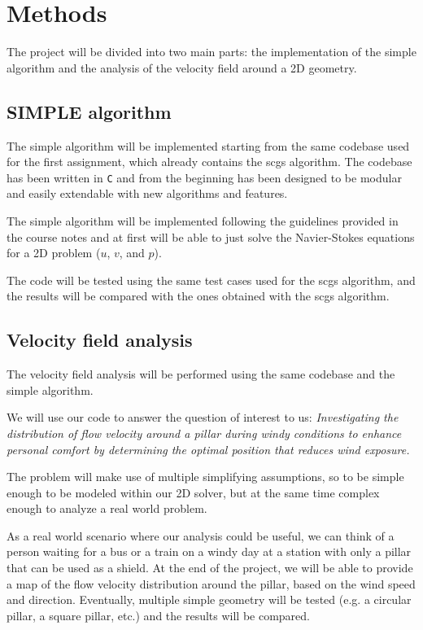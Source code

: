 \section{Methods}

The project will be divided into two main parts: the implementation of the \acrshort{simple} algorithm and the analysis of the velocity field around a 2D geometry.

\subsection{SIMPLE algorithm}

The \acrshort{simple} algorithm will be implemented starting from the same codebase used for the first assignment, which already contains the \acrshort{scgs} algorithm.
The codebase has been written in \texttt{C} and from the beginning has been designed to be modular and easily extendable with new algorithms and features.

The \acrshort{simple} algorithm will be implemented following the guidelines provided in the course notes and at first will be able to just solve the Navier-Stokes equations for a 2D problem ($u$, $v$, and $p$).

The code will be tested using the same test cases used for the \acrshort{scgs} algorithm, and the results will be compared with the ones obtained with the \acrshort{scgs} algorithm.

\subsection{Velocity field analysis}

The velocity field analysis will be performed using the same codebase and the \acrshort{simple} algorithm.

We will use our code to answer the question of interest to us: \emph{Investigating the distribution of flow velocity around a pillar during windy conditions to enhance personal comfort by determining the optimal position that reduces wind exposure.}

The problem will make use of multiple simplifying assumptions, so to be simple enough to be modeled within our 2D solver, but at the same time complex enough to analyze a real world problem.

As a real world scenario where our analysis could be useful, we can think of a person waiting for a bus or a train on a windy day at a station with only a pillar that can be used as a shield.
At the end of the project, we will be able to provide a map of the flow velocity distribution around the pillar, based on the wind speed and direction.
Eventually, multiple simple geometry will be tested (e.g. a circular pillar, a square pillar, etc.) and the results will be compared.

